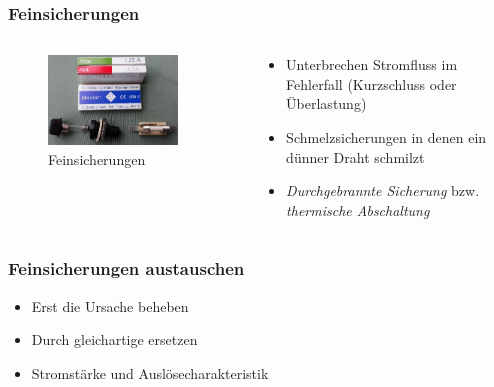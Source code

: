 \begin{frame}
\frametitle{Feinsicherungen}
\begin{columns}
    \begin{column}{0.48\textwidth}
    
\begin{figure}
    \includegraphics[width=0.85\textwidth]{foto/88}
    \caption{\scriptsize Feinsicherungen}
    \label{n_feinsicherungen}
\end{figure}

    \end{column}
   \begin{column}{0.48\textwidth}
       \begin{itemize}
  \item Unterbrechen Stromfluss im Fehlerfall (Kurzschluss oder Überlastung)
  \item Schmelzsicherungen in denen ein dünner Draht schmilzt
  \item \emph{Durchgebrannte Sicherung} bzw. \emph{thermische Abschaltung}
  \end{itemize}

   \end{column}
\end{columns}

\end{frame}

\begin{frame}
\frametitle{Feinsicherungen austauschen}
\begin{itemize}
  \item Erst die Ursache beheben
  \item Durch gleichartige ersetzen
  \item Stromstärke und Auslösecharakteristik
  \end{itemize}
\end{frame}

